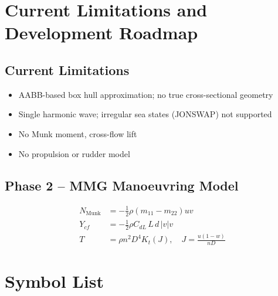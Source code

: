 \documentclass[12pt,a4paper]{article}
\begin{document}
\section{Current Limitations and Development Roadmap}

\subsection{Current Limitations}

\begin{itemize}
  \item AABB-based box hull approximation; no true cross-sectional geometry
  \item Single harmonic wave; irregular sea states (JONSWAP) not supported
  \item No Munk moment, cross-flow lift
  \item No propulsion or rudder model
\end{itemize}

\subsection{Phase 2 -- MMG Manoeuvring Model}

\begin{align}
  N_{\text{Munk}} &= -\tfrac{1}{2}\rho(m_{11}-m_{22})uv \label{eq:munk} \\
  Y_{cf} &= -\tfrac{1}{2}\rho C_{dL}\,L\,d\,|v|v \label{eq:crossflow} \\
  T &= \rho n^2 D^4 K_t(J),\quad J = \frac{u(1-w)}{nD} \label{eq:propeller}
\end{align}

\appendix
\section{Symbol List}
\end{document}
